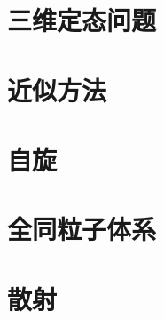     \section{三维定态问题}

    \section{近似方法}

    \section{自旋}

    \section{全同粒子体系}

    \section{散射}
    
    


  
